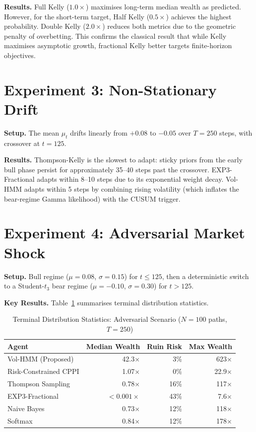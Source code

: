 \textbf{Results.} Full Kelly ($1.0\times$) maximises long-term median wealth
as predicted. However, for the short-term target, Half Kelly ($0.5\times$)
achieves the highest probability. Double Kelly ($2.0\times$) reduces both
metrics due to the geometric penalty of overbetting. This confirms the
classical result that while Kelly maximises asymptotic growth, fractional
Kelly better targets finite-horizon objectives.

\section{Experiment 3: Non-Stationary Drift}

\textbf{Setup.} The mean $\mu_t$ drifts linearly from $+0.08$ to $-0.05$
over $T = 250$ steps, with crossover at $t = 125$.

\textbf{Results.} Thompson-Kelly is the slowest to adapt: sticky priors
from the early bull phase persist for approximately 35--40 steps past the
crossover. EXP3-Fractional adapts within 8--10 steps due to its
exponential weight decay. Vol-HMM adapts within 5 steps by combining
rising volatility (which inflates the bear-regime Gamma likelihood) with
the CUSUM trigger.

\section{Experiment 4: Adversarial Market Shock}

\textbf{Setup.} Bull regime ($\mu = 0.08$, $\sigma = 0.15$) for
$t \leq 125$, then a deterministic switch to a Student-$t_3$ bear regime
($\mu = -0.10$, $\sigma = 0.30$) for $t > 125$.

\textbf{Key Results.} Table~\ref{tab:adversarial_results} summarises
terminal distribution statistics.

\begin{table}[h]
\centering
\caption{Terminal Distribution Statistics: Adversarial Scenario
         ($N=100$ paths, $T=250$)}
\label{tab:adversarial_results}
\renewcommand{\arraystretch}{1.2}
\begin{tabular}{lrrr}
\toprule
\textbf{Agent} & \textbf{Median Wealth} & \textbf{Ruin Risk} & \textbf{Max Wealth} \\
\midrule
Vol-HMM (Proposed)      & 42.3$\times$ & 3\%  & 623$\times$ \\
Risk-Constrained CPPI   & 1.07$\times$ & 0\%  & 22.9$\times$ \\
Thompson Sampling       & 0.78$\times$ & 16\% & 117$\times$ \\
EXP3-Fractional         & $< 0.001\times$ & 43\% & 7.6$\times$ \\
Naive Bayes             & 0.73$\times$ & 12\% & 118$\times$ \\
Softmax                 & 0.84$\times$ & 12\% & 178$\times$ \\
\bottomrule
\end{tabular}
\end{table}

